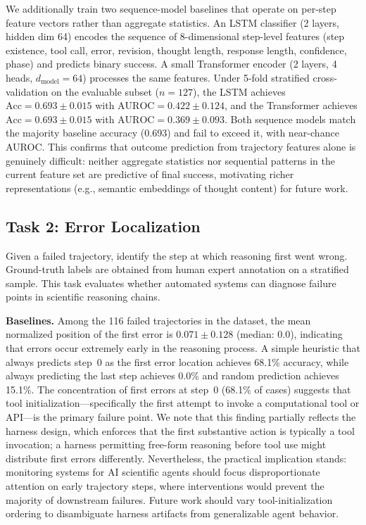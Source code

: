 \documentclass{article}
\begin{document}
We additionally train two sequence-model baselines that operate on per-step feature vectors rather than aggregate statistics. An LSTM classifier (2 layers, hidden dim 64) encodes the sequence of 8-dimensional step-level features (step existence, tool call, error, revision, thought length, response length, confidence, phase) and predicts binary success. A small Transformer encoder (2 layers, 4 heads, $d_{\text{model}}=64$) processes the same features. Under 5-fold stratified cross-validation on the evaluable subset ($n=127$), the LSTM achieves $\text{Acc}=0.693 \pm 0.015$ with $\text{AUROC}=0.422 \pm 0.124$, and the Transformer achieves $\text{Acc}=0.693 \pm 0.015$ with $\text{AUROC}=0.369 \pm 0.093$. Both sequence models match the majority baseline accuracy (0.693) and fail to exceed it, with near-chance AUROC\@. This confirms that outcome prediction from trajectory features alone is genuinely difficult: neither aggregate statistics nor sequential patterns in the current feature set are predictive of final success, motivating richer representations (e.g., semantic embeddings of thought content) for future work.

\subsection{Task 2: Error Localization}
\label{sec:task2}

Given a failed trajectory, identify the step at which reasoning first went wrong. Ground-truth labels are obtained from human expert annotation on a stratified sample. This task evaluates whether automated systems can diagnose failure points in scientific reasoning chains.

\textbf{Baselines.} Among the 116 failed trajectories in the dataset, the mean normalized position of the first error is $0.071 \pm 0.128$ (median: 0.0), indicating that errors occur extremely early in the reasoning process. A simple heuristic that always predicts step~0 as the first error location achieves 68.1\% accuracy, while always predicting the last step achieves 0.0\% and random prediction achieves 15.1\%. The concentration of first errors at step~0 (68.1\% of cases) suggests that tool initialization---specifically the first attempt to invoke a computational tool or API---is the primary failure point. We note that this finding partially reflects the harness design, which enforces that the first substantive action is typically a tool invocation; a harness permitting free-form reasoning before tool use might distribute first errors differently. Nevertheless, the practical implication stands: monitoring systems for AI scientific agents should focus disproportionate attention on early trajectory steps, where interventions would prevent the majority of downstream failures. Future work should vary tool-initialization ordering to disambiguate harness artifacts from generalizable agent behavior.
\end{document}
